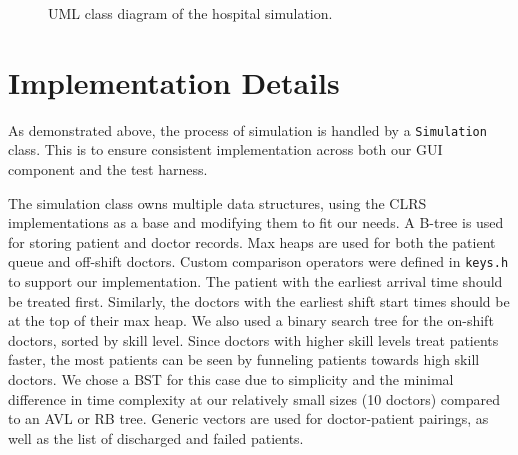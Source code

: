 \documentclass[11pt]{article}
\theoremstyle{plain}
\theoremstyle{definition}
\begin{document}
\begin{figure}[H]
\caption{UML class diagram of the hospital simulation.}
\label{fig:uml}
\end{figure}

\section{Implementation Details}

As demonstrated above, the process of simulation is handled by a \texttt{Simulation} class. This is to ensure consistent implementation across both our GUI component and the test harness.

The simulation class owns multiple data structures, using the CLRS implementations as a base and modifying them to fit our needs. A B-tree is used for storing patient and doctor records. Max heaps are used for both the patient queue and off-shift doctors. Custom comparison operators were defined in \texttt{keys.h} to support our implementation. The patient with the earliest arrival time should be treated first. Similarly, the doctors with the earliest shift start times should be at the top of their max heap. We also used a binary search tree for the on-shift doctors, sorted by skill level. Since doctors with higher skill levels treat patients faster, the most patients can be seen by funneling patients towards high skill doctors. We chose a BST for this case due to simplicity and the minimal difference in time complexity at our relatively small sizes (10 doctors) compared to an AVL or RB tree. Generic vectors are used for doctor-patient pairings, as well as the list of discharged and failed patients.
\end{document}
